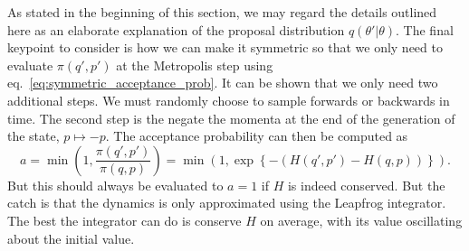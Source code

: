 As stated in the beginning of this section, we may regard the details outlined here as an elaborate explanation of the proposal distribution $q(\theta'|\theta)$. The final keypoint to consider is how we can make it symmetric so
that we only need to evaluate $\pi(q', p')$ at the Metropolis step using eq.~\eqref{eq:symmetric_acceptance_prob}. It can be shown that we only need two additional steps. We must randomly choose to sample forwards or backwards in time. The second step is the negate the momenta at the end of the generation of the state, $p \mapsto -p$. The acceptance probability can then be computed as
\begin{equation}
  a = \min \left(1, \frac{\pi(q', p')}{\pi(q, p)}\right) = \min \left(1, \exp\left\{-\left(H(q',p') - H(q, p)\right)\right\}\right).
\end{equation}
But this should always be evaluated to $a = 1$ if $H$ is indeed conserved. But the catch is that the dynamics is only approximated using the Leapfrog integrator. The best the integrator can do is conserve $H$ on average, with its value oscillating about the initial value.

